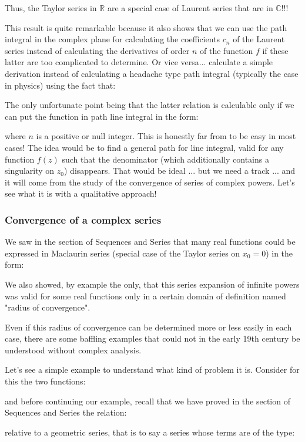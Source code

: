 	Thus, the Taylor series in $\mathbb{R}$ are a special case of Laurent series that are in $\mathbb{C}$!!!
	
	This result is quite remarkable because it also shows that we can use the path integral in the complex plane for calculating the coefficients $c_n$ of the Laurent series instead of calculating the derivatives of order $n$ of the function $f$ if these latter are too complicated to determine. Or vice versa... calculate a simple derivation instead of calculating a headache type path integral (typically the case in physics) using the fact that:
	
	The only unfortunate point being that the latter relation is calculable only if we can put the function in path line integral in the form:
	
	where $n$ is a positive or null integer. This is honestly far from to be easy in most cases! The idea would be to find a general path for line integral, valid for any function $f (z)$ such that the denominator (which additionally contains a singularity on $z_0$) disappears. That would be ideal ... but we need a track ... and it will come from the study of the convergence of series of complex powers. Let's see what it is with a qualitative approach!
	
	\pagebreak
	\subsubsection{Convergence of a complex series}
	We saw in the section of Sequences and Series that many real functions could be expressed in Maclaurin series (special case of the Taylor series on $x_0=0$) in the form:
	
	We also showed, by example the only, that this series expansion of infinite powers was valid for some real functions only in a certain domain of definition named "radius of convergence".
	
	Even if this radius of convergence can be determined more or less easily in each case, there are some baffling examples that could not in the early 19th century be understood without complex analysis.
	
	Let's see a simple example to understand what kind of problem it is. Consider for this the two functions:
	
	and before continuing our example, recall that we have proved in the section of Sequences and Series the relation:
	
	relative to a geometric series, that is to say a series whose terms are of the type:
	
